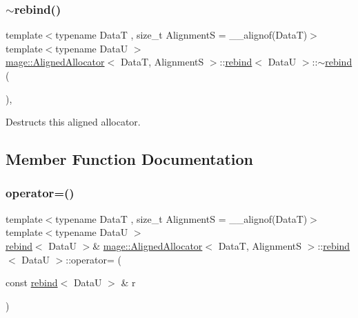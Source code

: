 \subsubsection{\texorpdfstring{$\sim$rebind()}{~rebind()}}
{\footnotesize\ttfamily template$<$typename DataT , size\+\_\+t AlignmentS = \+\_\+\+\_\+alignof(\+Data\+T)$>$ \\
template$<$typename DataU $>$ \\
\hyperlink{structmage_1_1_aligned_allocator}{mage\+::\+Aligned\+Allocator}$<$ DataT, AlignmentS $>$\+::\hyperlink{structmage_1_1_aligned_allocator_1_1rebind}{rebind}$<$ DataU $>$\+::$\sim$\hyperlink{structmage_1_1_aligned_allocator_1_1rebind}{rebind} (\begin{DoxyParamCaption}{ }\end{DoxyParamCaption})\hspace{0.3cm}{\ttfamily [private]}, {\ttfamily [delete]}}

Destructs this aligned allocator. 

\subsection{Member Function Documentation}
\hypertarget{structmage_1_1_aligned_allocator_1_1rebind_a2ce8caabcc8c6bab90e1314c12261a84}{}\label{structmage_1_1_aligned_allocator_1_1rebind_a2ce8caabcc8c6bab90e1314c12261a84} 
\subsubsection{\texorpdfstring{operator=()}{operator=()}\hspace{0.1cm}{\footnotesize\ttfamily [1/2]}}
{\footnotesize\ttfamily template$<$typename DataT , size\+\_\+t AlignmentS = \+\_\+\+\_\+alignof(\+Data\+T)$>$ \\
template$<$typename DataU $>$ \\
\hyperlink{structmage_1_1_aligned_allocator_1_1rebind}{rebind}$<$ DataU $>$\& \hyperlink{structmage_1_1_aligned_allocator}{mage\+::\+Aligned\+Allocator}$<$ DataT, AlignmentS $>$\+::\hyperlink{structmage_1_1_aligned_allocator_1_1rebind}{rebind}$<$ DataU $>$\+::operator= (\begin{DoxyParamCaption}\item[{const \hyperlink{structmage_1_1_aligned_allocator_1_1rebind}{rebind}$<$ DataU $>$ \&}]{r }\end{DoxyParamCaption})\hspace{0.3cm}{\ttfamily [delete]}}

